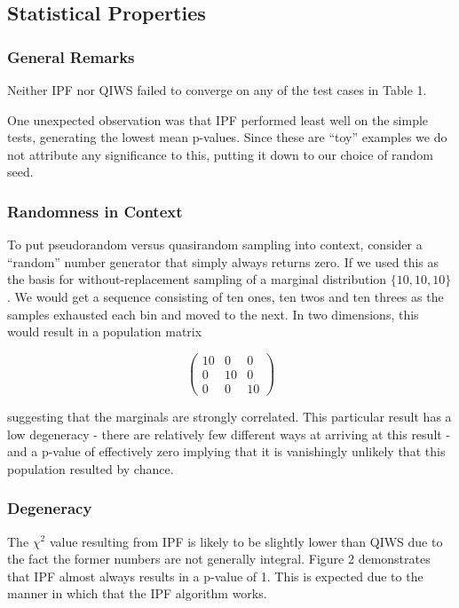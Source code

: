 \documentclass[]{article}
\begin{document}
\subsection{Statistical Properties}\label{statistical-properties-1}

\subsubsection{General Remarks}\label{general-remarks}

Neither IPF nor QIWS failed to converge on any of the test cases in
Table 1.

One unexpected observation was that IPF performed least well on the
simple tests, generating the lowest mean p-values. Since these are
``toy'' examples we do not attribute any significance to this, putting
it down to our choice of random seed.

\subsubsection{Randomness in Context}\label{randomness-in-context}

To put pseudorandom versus quasirandom sampling into context, consider a
``random'' number generator that simply always returns zero. If we used
this as the basis for without-replacement sampling of a marginal
distribution \(\lbrace10,10,10\rbrace\). We would get a sequence
consisting of ten ones, ten twos and ten threes as the samples exhausted
each bin and moved to the next. In two dimensions, this would result in
a population matrix

\[\left( \begin{array}{ccc}
10 & 0 & 0 \\
0 & 10 & 0 \\
0 & 0 & 10 \end{array} \right)\]

suggesting that the marginals are strongly correlated. This particular
result has a low degeneracy - there are relatively few different ways at
arriving at this result - and a p-value of effectively zero implying
that it is vanishingly unlikely that this population resulted by chance.

\subsubsection{Degeneracy}\label{degeneracy}

The \(\chi^2\) value resulting from IPF is likely to be slightly lower
than QIWS due to the fact the former numbers are not generally integral.
Figure 2 demonstrates that IPF almost always results in a p-value of 1.
This is expected due to the manner in which that the IPF algorithm
works.
\end{document}
